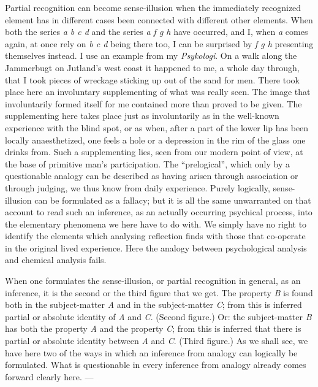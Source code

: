 \documentclass[12pt]{book}
\newcommand{\opage}[1]{\marginnote{\footnotesize\textit{[#1]}}}
\begin{document}
Partial recognition can become sense-illusion when the immediately recognized
element has in different cases been connected with different other elements.
When both the series \textit{a b c d} and the series \textit{a f g h} have
occurred, and I, when \textit{a} comes again, at once rely on \textit{b c d}
being there too, I can be surprised by \textit{f g h} presenting themselves
instead. I use an example from my \textit{Psykologi}. On a walk along the
Jammerbugt on Jutland's west coast it happened to me, a whole day through, that
I took pieces of wreckage sticking up out of the sand for men. There took place
here an involuntary supplementing of what was really seen. The image that
involuntarily formed itself for me contained more than proved to be given. The
supplementing here takes place just as involuntarily as in the well-known
experience with the blind spot, or as when, after a part of the lower lip has
been locally anaesthetized, one feels a hole or a depression in the rim of the
glass one drinks from. Such a supplementing lies, seen from our modern point of
view, at the base of primitive man's participation. The ``prelogical'', which
only by a questionable analogy can be described as having arisen through
association or through judging, we thus know from daily experience. Purely
logically, sense-illusion can be formulated as a fallacy; but it is all the same
unwarranted on that account to read such an inference, as an actually occurring
psychical process, into the elementary phenomena we here have to do with. We
simply have no right to identify the elements which analysing reflection finds
with those that co-operate in the original lived experience. Here the analogy
between psychological analysis and chemical analysis fails.

\opage{22}When one formulates the sense-illusion, or partial recognition in general, as an
inference, it is the second or the third figure that we get. The property
\textit{B} is found both in the subject-matter \textit{A} and in the
subject-matter \textit{C}; from this is inferred partial or absolute identity of
\textit{A} and \textit{C}. (Second figure.) Or: the subject-matter \textit{B}
has both the property \textit{A} and the property \textit{C}; from this is
inferred that there is partial or absolute identity between \textit{A} and
\textit{C}. (Third figure.) As we shall see, we have here two of the ways in
which an inference from analogy can logically be formulated. What is
questionable in every inference from analogy already comes forward clearly
here. ---
\end{document}
